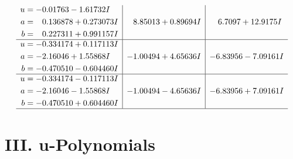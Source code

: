 \documentclass[1p]{elsarticle_modified}
\theoremstyle{definition}
\begin{document}
$$\begin{array}{c|c|c}
\begin{aligned}
u &= -0.01763 - 1.61732 I \\
a &= \phantom{-}0.136878 + 0.273073 I \\
b &= \phantom{-}0.227311 + 0.991157 I\end{aligned}
 & \phantom{-}8.85013 + 0.89694 I & \phantom{-}6.7097 + 12.9175 I \\ \hline\begin{aligned}
u &= -0.334174 + 0.117113 I \\
a &= -2.16046 + 1.55868 I \\
b &= -0.470510 - 0.604460 I\end{aligned}
 & -1.00494 + 4.65636 I & -6.83956 - 7.09161 I \\ \hline\begin{aligned}
u &= -0.334174 - 0.117113 I \\
a &= -2.16046 - 1.55868 I \\
b &= -0.470510 + 0.604460 I\end{aligned}
 & -1.00494 - 4.65636 I & -6.83956 + 7.09161 I\\
 \hline 
 \end{array}$$\newpage
\newpage\renewcommand{\arraystretch}{1}
\centering \section*{ III. u-Polynomials}
\end{document}
